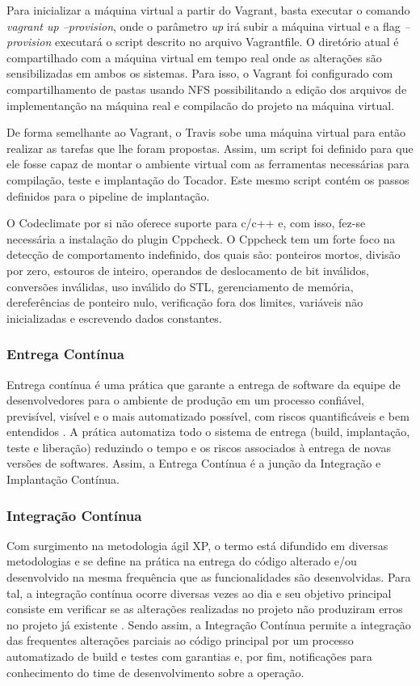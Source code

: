 Para inicializar a máquina virtual a partir do Vagrant, basta executar o comando \textit{vagrant up --provision}, onde o parâmetro \textit{up} irá subir a máquina virtual e a flag \textit{--provision} executará o script descrito no arquivo Vagrantfile. O diretório atual é compartilhado com a máquina virtual em tempo real onde as alterações são sensibilizadas em ambos os sistemas. Para isso, o Vagrant foi configurado com compartilhamento de pastas usando NFS possibilitando a edição dos arquivos de implementanção na máquina real e compilacão do projeto na máquina virtual.

De forma semelhante ao Vagrant, o Travis sobe uma máquina virtual para então realizar as tarefas que lhe foram propostas. Assim, um script foi definido para que ele fosse capaz de montar o ambiente virtual com as ferramentas necessárias para compilação, teste e implantação do Tocador. Este mesmo script contém os passos definidos para o pipeline de implantação.

O Codeclimate por si não oferece suporte para c/c++ e, com isso, fez-se necessária a instalação do plugin Cppcheck. O Cppcheck tem um forte foco na detecção de comportamento indefinido, dos quais são: ponteiros mortos, divisão por zero, estouros de inteiro, operandos de deslocamento de bit inválidos, conversões inválidas, uso inválido do STL, gerenciamento de memória, dereferências de ponteiro nulo, verificação fora dos limites, variáveis não inicializadas e escrevendo dados constantes.
 
\subsubsection{Entrega Contínua}

Entrega contínua é uma prática que garante a entrega de software da equipe de desenvolvedores para o ambiente de produção em um processo confiável, previsível, visível e o mais automatizado possível, com riscos quantificáveis e bem entendidos \cite{humble2010continuous}. A prática automatiza todo o sistema de entrega (build, implantação, teste e liberação) reduzindo o tempo e os riscos associados à entrega de novas versões de softwares. Assim, a Entrega Contínua é a junção da Integração e Implantação Contínua.

\subsubsection{Integração Contínua}

Com surgimento na metodologia ágil XP, o termo está difundido em diversas metodologias e se define na prática na entrega do código alterado e/ou desenvolvido na mesma frequência que as funcionalidades são desenvolvidas. Para tal, a integração contínua ocorre diversas vezes ao dia e seu objetivo principal consiste em verificar se as alterações realizadas no projeto não produziram erros no projeto já existente \cite{beck2001planning}. Sendo assim, a Integração Contínua permite a integração das frequentes alterações parciais ao código principal por um processo automatizado de build e testes com garantias e, por fim, notificações para conhecimento do time de desenvolvimento sobre a operação.

